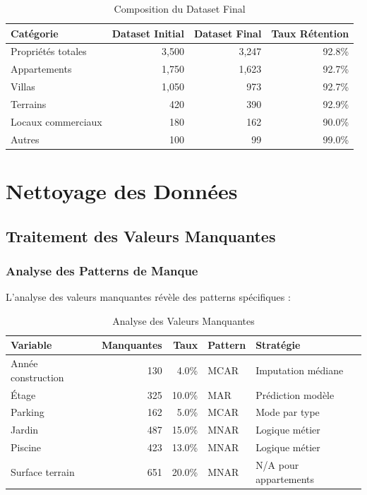 \begin{table}[H]
\centering
\caption{Composition du Dataset Final}
\begin{tabular}{|l|r|r|r|}
\hline
\textbf{Catégorie} & \textbf{Dataset Initial} & \textbf{Dataset Final} & \textbf{Taux Rétention} \\
\hline
Propriétés totales & 3,500 & 3,247 & 92.8\% \\
\hline
Appartements & 1,750 & 1,623 & 92.7\% \\
\hline
Villas & 1,050 & 973 & 92.7\% \\
\hline
Terrains & 420 & 390 & 92.9\% \\
\hline
Locaux commerciaux & 180 & 162 & 90.0\% \\
\hline
Autres & 100 & 99 & 99.0\% \\
\hline
\end{tabular}
\label{tab:composition_dataset_final}
\end{table}

\section{Nettoyage des Données}
\label{sec:nettoyage_donnees}

\subsection{Traitement des Valeurs Manquantes}
\label{subsec:traitement_valeurs_manquantes}

\subsubsection{Analyse des Patterns de Manque}

L'analyse des valeurs manquantes révèle des patterns spécifiques :

\begin{table}[H]
\centering
\caption{Analyse des Valeurs Manquantes}
\begin{tabular}{|l|r|r|l|l|}
\hline
\textbf{Variable} & \textbf{Manquantes} & \textbf{Taux} & \textbf{Pattern} & \textbf{Stratégie} \\
\hline
Année construction & 130 & 4.0\% & MCAR & Imputation médiane \\
\hline
Étage & 325 & 10.0\% & MAR & Prédiction modèle \\
\hline
Parking & 162 & 5.0\% & MCAR & Mode par type \\
\hline
Jardin & 487 & 15.0\% & MNAR & Logique métier \\
\hline
Piscine & 423 & 13.0\% & MNAR & Logique métier \\
\hline
Surface terrain & 651 & 20.0\% & MNAR & N/A pour appartements \\
\hline
\end{tabular}
\label{tab:analyse_valeurs_manquantes}
\end{table}

